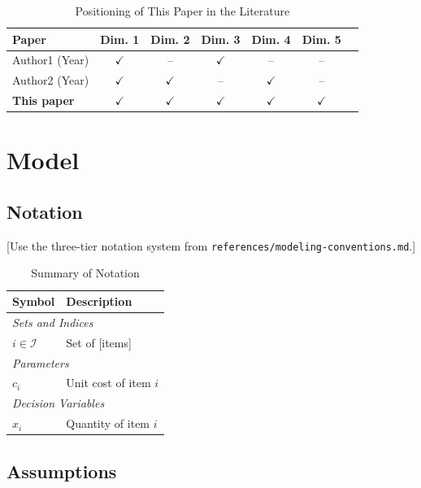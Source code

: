 \documentclass[12pt,letterpaper]{article}
\theoremstyle{definition}
\begin{document}
\begin{table}[htbp]
\centering
\caption{Positioning of This Paper in the Literature}
\label{tab:literature}
\begin{tabular}{@{}lcccccc@{}}
\toprule
\textbf{Paper} & \textbf{Dim. 1} & \textbf{Dim. 2} & \textbf{Dim. 3} & \textbf{Dim. 4} & \textbf{Dim. 5} \\
\midrule
Author1 (Year) & $\checkmark$ & -- & $\checkmark$ & -- & -- \\
Author2 (Year) & $\checkmark$ & $\checkmark$ & -- & $\checkmark$ & -- \\
\midrule
\textbf{This paper} & \textbf{$\checkmark$} & \textbf{$\checkmark$} & \textbf{$\checkmark$} & \textbf{$\checkmark$} & \textbf{$\checkmark$} \\
\bottomrule
\end{tabular}
\end{table}

\section{Model}

\subsection{Notation}

[Use the three-tier notation system from \texttt{references/modeling-conventions.md}.]

\begin{table}[htbp]
\centering
\caption{Summary of Notation}
\begin{tabular}{@{}ll@{}}
\toprule
\textbf{Symbol} & \textbf{Description} \\
\midrule
\multicolumn{2}{l}{\textit{Sets and Indices}} \\
$i \in \mathcal{I}$ & Set of [items] \\
\multicolumn{2}{l}{\textit{Parameters}} \\
$c_i$ & Unit cost of item $i$ \\
\multicolumn{2}{l}{\textit{Decision Variables}} \\
$x_i$ & Quantity of item $i$ \\
\bottomrule
\end{tabular}
\end{table}

\subsection{Assumptions}
\end{document}
